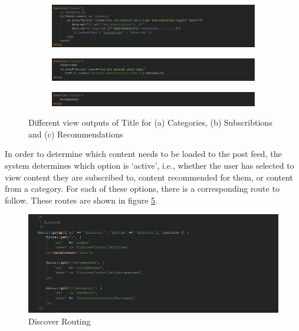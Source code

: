 \begin{figure}[H]
\centering
\begin{subfigure}[b]{1\linewidth}
    \includegraphics[width=\textwidth]{Images/Implementation/CategoryBladePhp}
    \caption{}
    \label{fig:CategoryBladePhp}
\end{subfigure}
\begin{subfigure}[b]{1\linewidth}
    \includegraphics[width=\textwidth]{Images/Implementation/IndexBladePhp}
    \caption{}
    \label{fig:IndexBladePhp}
\end{subfigure}
\begin{subfigure}[b]{1\linewidth}
    \includegraphics[width=\textwidth]{Images/Implementation/RecommendedBladePhp}
    \caption{}
    \label{fig:RecommendedBladePhp}
\end{subfigure}
\caption{Different view outputs of Title for (a) Categories, (b) Subscribtions and (c) Recommendations}
\label{fig:DiscoverTitle}
\end{figure}

In order to determine which content needs to be loaded to the post feed, the system determines which option is `active', i.e., whether the user has selected to view content they are subscribed to, content recommended for them, or content from a category. For each of these options, there is a corresponding route to follow. These routes are shown in figure \ref{fig:DiscoverRouting}.

\begin{figure}[H]
\centering
\includegraphics[width=\textwidth]{Images/Implementation/DiscoverRouting}
\caption{Discover Routing}
\label{fig:DiscoverRouting}
\end{figure}

